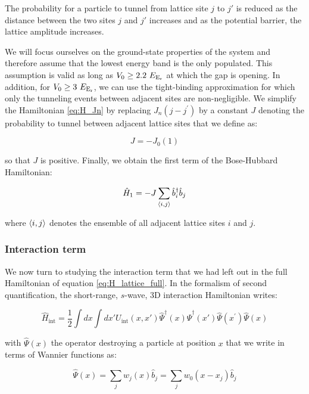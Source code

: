 \noindent The probability for a particle to tunnel from lattice site $j$ to $j'$ is reduced as the distance between the two sites $j$ and $j'$ increases and as the potential barrier, \ie the lattice amplitude increases.

We will focus ourselves on the ground-state properties of the system and therefore assume that the lowest energy band is the only populated. This assumption is valid as long as $V_0 \geq 2.2 \ E_{\rm{E_r}}$ at which the gap is opening. In addition, for $V_0 \geq 3 \ E_{\rm{E_r}}$, we can use the tight-binding approximation for which only the tunneling events between adjacent sites are non-negligible. We simplify the Hamiltonian \ref{eq:H_Jn} by replacing  $J_{n}\left(j-j^{\prime}\right)$ by a constant $J$ denoting the probability to tunnel between adjacent lattice sites that we define as:

\begin{equation}
    J=-J_0(1)
\end{equation}

\noindent so that $J$ is positive. Finally, we obtain the first term of the Bose-Hubbard Hamiltonian:

\begin{equation}
    \hat{H}_1 = -J \sum_{\left\langle i,j\right\rangle} \hat{b}^{\dagger}_i \hat{b}_j
    \label{eq:H_band}
\end{equation}

\noindent where $\left\langle i,j\right\rangle$ denotes the ensemble of all adjacent lattice sites $i$ and $j$.

\subsubsection{Interaction term}
We now turn to studying the interaction term that we had left out in the full Hamiltonian of equation \ref{eq:H_lattice_full}. In the formalism of second quantification, the short-range, $s$-wave, 3D interaction Hamiltonian writes:

\begin{equation}
    \hat{H}_{\mathrm{int}}=\frac{1}{2} \int d x \int d x' U_{\mathrm{int}}\left(x, x'\right) \hat{\Psi}^{\dagger}(x) \hat{\Psi}^{\dagger}\left(x'\right) \hat{\Psi}\left(x^{\prime}\right) \hat{\Psi}(x)
\end{equation}

\noindent with $\hat{\Psi}(x)$ the operator destroying a particle at position $x$ that we write in terms of Wannier functions as:

\begin{equation}
    \hat{\Psi}(x)=\sum_{j} w_{j}(x) \hat{b}_{j} = \sum_{j} w_{0}(x-x_j) \hat{b}_{j} 
    \label{eq:atom_operator_lattice}
\end{equation}

